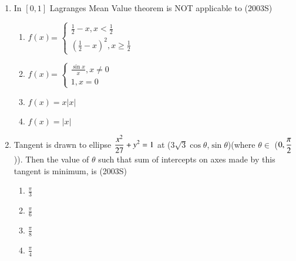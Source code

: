 \documentclass[journal,12pt,twocolumn]{IEEEtran}
\theoremstyle{remark}
\begin{document}
\begin{enumerate}
\item In $[0,1]$ Lagranges Mean Value theorem is NOT applicable to
\hfill {(2003S)}

\begin{enumerate}
    \item $f(x)$=
    $\begin{cases}
         \displaystyle\frac{1}{2}-x, x<\displaystyle\frac{1}{2}\\
        \left(\displaystyle\frac{1}{2}-x\right)^2, x\geq \displaystyle\frac{1}{2}
    \end{cases}$\\
     \item $f(x)$=
    $\begin{cases}
        \displaystyle\frac{\sin x}{x}, x\neq 0\\
        1, x=0
    \end{cases}$\\
    \item $f(x)=x|x|$
    \item $f(x)= |x|$\\
\end{enumerate}
\item Tangent is drawn to ellipse $\displaystyle\displaystyle\frac{x^2}{27}+y^2 = 1$ at ($3\sqrt{3}\cos\theta$,$\sin\theta$)(where $\theta \in $ ($0,\displaystyle\displaystyle\frac{\pi}{2}$)). Then the value of $\theta$ such that sum of intercepts on axes made by this tangent is minimum, is
\hfill {(2003S)}
\begin{enumerate}
    \item $\displaystyle\frac{\pi}{3}$\\
    \item $\displaystyle\frac{\pi}{6}$\\
    \item $\displaystyle\frac{\pi}{8}$\\
    \item $\displaystyle\frac{\pi}{4}$\\
 \end{enumerate}
\end{enumerate}
\end{document}
